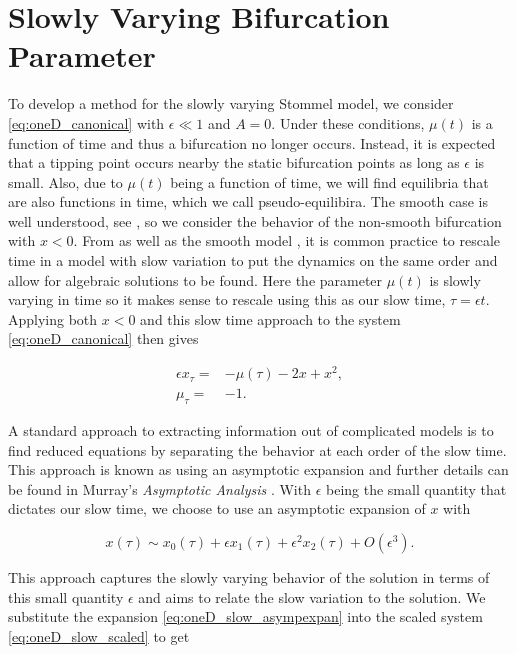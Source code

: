 \section{Slowly Varying Bifurcation Parameter}
\label{sec:oneD_slow}

To develop a method for the slowly varying Stommel model, we consider \eqref{eq:oneD_canonical} with $\epsilon\ll 1$ and $A=0$. Under these conditions, $\mu(t)$ is a function of time and thus a bifurcation no longer occurs. Instead, it is expected that a tipping point occurs nearby the static bifurcation points as long as $\epsilon$ is small. Also, due to $\mu(t)$ being a function of time, we will find equilibria that are also functions in time, which we call pseudo-equilibira. The smooth case is well understood, see \cite{zhu2015tipping}, so we consider the behavior of the non-smooth bifurcation with $x<0$. From \cite{haberman1979slowly} as well as the smooth model \cite{zhu2015tipping}, it is common practice to rescale time in a model with slow variation to put the dynamics on the same order and allow for algebraic solutions to be found. Here the parameter $\mu(t)$ is slowly varying in time so it makes sense to rescale using this as our slow time, $\tau=\epsilon t$. Applying both $x<0$ and this slow time approach to the system \eqref{eq:oneD_canonical} then gives

\begin{equation}\label{eq:oneD_slow_scaled}
\begin{aligned}
\epsilon x_\tau=&-\mu(\tau)-2x+x^2,\\
\mu_\tau=&-1.
\end{aligned}
\end{equation}

A standard approach to extracting information out of complicated models is to find reduced equations by separating the behavior at each order of the slow time. This approach is known as using an asymptotic expansion and further details can be found in Murray's \textit{Asymptotic Analysis} \cite{murray2012asymptotic}. With $\epsilon$ being the small quantity that dictates our slow time, we choose to use an asymptotic expansion of $x$ with

\begin{equation}\label{eq:oneD_slow_asympexpan}
x(\tau)\sim x_0(\tau)+\epsilon x_1(\tau)+\epsilon^2 x_2(\tau)+O(\epsilon^3).
\end{equation}

This approach captures the slowly varying behavior of the solution in terms of this small quantity $\epsilon$ and aims to relate the slow variation to the solution. We substitute the expansion \eqref{eq:oneD_slow_asympexpan} into the scaled system \eqref{eq:oneD_slow_scaled} to get


